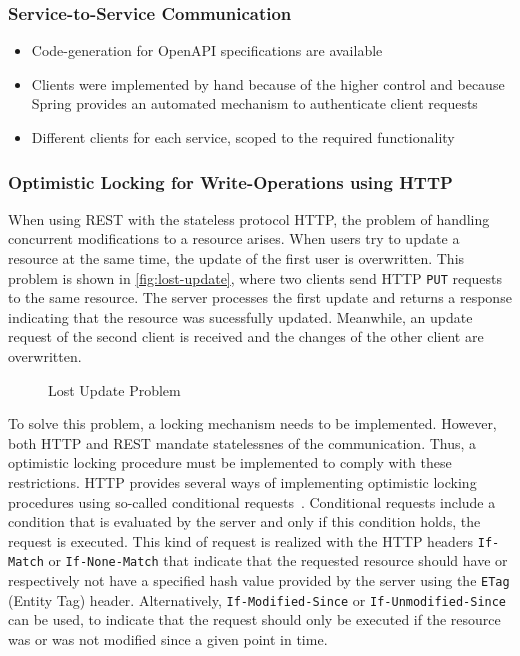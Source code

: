 \subsubsection{Service-to-Service Communication}

\begin{itemize}
    \item Code-generation for OpenAPI specifications are available
    \item Clients were implemented by hand because of the higher control and because Spring provides an automated mechanism to authenticate client requests
    \item Different clients for each service, scoped to the required functionality
\end{itemize}

\subsubsection{Optimistic Locking for Write-Operations using \acs{HTTP}}

When using \ac{REST} with the stateless protocol \ac{HTTP}, the problem of handling concurrent modifications to a resource arises.
When users try to update a resource at the same time, the update of the first user is overwritten.
This problem is shown in \autoref{fig:lost-update}, where two clients send \ac{HTTP} \texttt{PUT} requests to the same resource.
The server processes the first update and returns a response indicating that the resource was sucessfully updated.
Meanwhile, an update request of the second client is received and the changes of the other client are overwritten.

\begin{figure}[!htb]
    \centering
    
    \caption{Lost Update Problem}
    \label{fig:lost-update}
\end{figure}

To solve this problem, a locking mechanism needs to be implemented.
However, both \ac{HTTP} and \ac{REST} mandate statelessnes of the communication.
Thus, a optimistic locking procedure must be implemented to comply with these restrictions.
\ac{HTTP} provides several ways of implementing optimistic locking procedures using so-called conditional requests~\cite{MDN2020}.
Conditional requests include a condition that is evaluated by the server and only if this condition holds, the request is executed.
This kind of request is realized with the \ac{HTTP} headers \texttt{If-Match} or \texttt{If-None-Match} that indicate that the requested resource should have or respectively not have a specified hash value provided by the server using the \texttt{ETag} (Entity Tag) header.
Alternatively, \texttt{If-Modified-Since} or \texttt{If-Unmodified-Since} can be used, to indicate that the request should only be executed if the resource was or was not modified since a given point in time.

